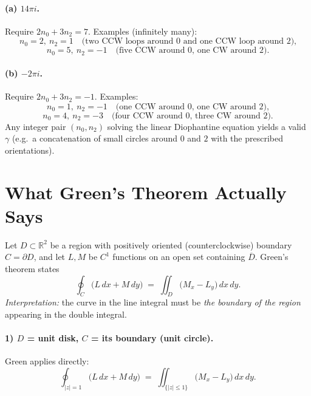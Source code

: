 \documentclass[11pt]{article}
\begin{document}
\paragraph{(a) $14\pi i$.}
Require $2n_0+3n_2=7$. Examples (infinitely many):
\[
n_0=2,\ n_2=1
\quad\text{(two CCW loops around $0$ and one CCW loop around $2$),}
\]
\[
n_0=5,\ n_2=-1
\quad\text{(five CCW around $0$, one CW around $2$).}
\]

\paragraph{(b) $-2\pi i$.}
Require $2n_0+3n_2=-1$. Examples:
\[
n_0=1,\ n_2=-1
\quad\text{(one CCW around $0$, one CW around $2$),}
\]
\[
n_0=4,\ n_2=-3
\quad\text{(four CCW around $0$, three CW around $2$).}
\]
Any integer pair $(n_0,n_2)$ solving the linear Diophantine equation yields a valid $\gamma$
(e.g.\ a concatenation of small circles around $0$ and $2$ with the prescribed orientations).

\section*{What Green's Theorem Actually Says}

Let $D\subset\mathbb{R}^2$ be a region with positively oriented (counterclockwise) boundary
$C=\partial D$, and let $L,M$ be $C^1$ functions on an open set containing $\overline{D}$.
Green's theorem states
\[
\oint_{C}\!\bigl(L\,dx+M\,dy\bigr)
\;=\;
\iint_{D}\!\bigl(M_{x}-L_{y}\bigr)\,dx\,dy.
\]
\emph{Interpretation:} the curve in the line integral must be \emph{the boundary of the region}
appearing in the double integral.

\bigskip

\paragraph{1) $D$ = unit disk, $C$ = its boundary (unit circle).}
Green applies directly:
\[
\oint_{|z|=1}\!\bigl(L\,dx+M\,dy\bigr)
\;=\;
\iint_{\{|z|\le 1\}}\!\bigl(M_{x}-L_{y}\bigr)\,dx\,dy.
\]

\bigskip
\end{document}
